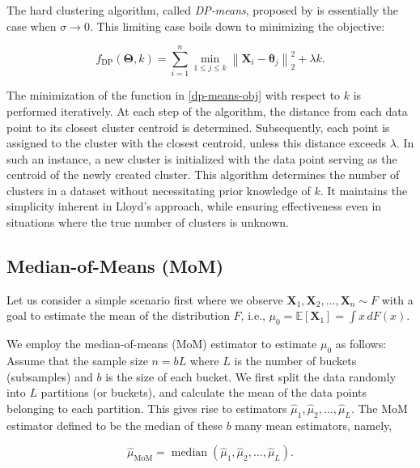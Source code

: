 \documentclass{article}
\newcommand{\bX}{\boldsymbol{X}}
\newcommand{\bTheta}{\boldsymbol{\Theta}}
\begin{document}
The hard clustering algorithm, called \textit{DP-means}, proposed by \cite{DP-Means} is essentially the case when $\sigma \to 0$. This limiting case boils down to minimizing the objective:

\begin{equation}\label{dp-means-obj}
    f_{\operatorname{DP}} (\bTheta, k)=\sum_{i=1}^n \min _{1 \leq j \leq k}\left\|{\bX}_i-\boldsymbol{\theta}_j\right\|_2^2+\lambda k.
\end{equation}

The minimization of the function in \eqref{dp-means-obj} with respect to $k$ is performed iteratively. At each step of the algorithm, the distance from each data point to its closest cluster centroid is determined. Subsequently, each point is assigned to the cluster with the closest centroid, unless this distance exceeds $\lambda$. In such an instance, a new cluster is initialized with the data point serving as the centroid of the newly created cluster. This algorithm determines the number of clusters in a dataset without necessitating prior knowledge of $k$. It maintains the simplicity inherent in Lloyd's approach, while ensuring effectiveness even in situations where the true number of clusters is unknown.


\subsection{Median-of-Means (MoM)}

Let us consider a simple scenario first where we observe $\bX_1,\bX_2,\ldots,\bX_n\sim F$ with a goal to estimate the mean of the distribution $F$, i.e., $\mu_0=\mathbb{E} [\bX_1]=\int x\,dF(x)$.

We employ the median-of-means (MoM) estimator to estimate $\mu_0$ as follows: Assume that the sample size $n=bL$ where $L$ is the number of buckets (subsamples) and $b$ is the size of each bucket. We first split the data randomly into $L$ partitions (or buckets), and calculate the mean of the data points belonging to each partition. This gives rise to estimators $\hat{\mu}_1,\hat{\mu}_2,\ldots,\hat{\mu}_L$. The MoM estimator defined to be the median of these $b$ many mean estimators, namely,

\begin{equation}\label{MoM-defn}
\hat{\mu}_{\text{MoM}}=\operatorname{median} (\hat{\mu}_1,\hat{\mu}_2,\ldots,\hat{\mu}_L).
\end{equation}
\end{document}
